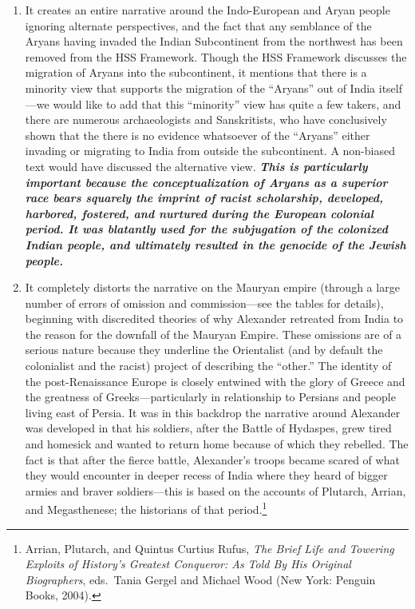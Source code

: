 \begin{enumerate} 
\item It creates an entire narrative around the Indo-European and Aryan people ignoring alternate perspectives, and the fact that any semblance of the Aryans having invaded the Indian Subcontinent from the northwest has been removed from the HSS Framework. Though the HSS Framework discusses the migration of Aryans into the subcontinent, it mentions that there is a minority view that supports the migration of the “Aryans” out of India itself—we would like to add that this “minority” view has quite a few takers, and there are numerous archaeologists and Sanskritists, who have conclusively shown that the there is no evidence whatsoever of the “Aryans” either invading or migrating to India from outside the subcontinent. A non-biased text would have discussed the alternative view. \textit{\textbf{This is particularly important because the conceptualization of Aryans as a superior race bears squarely the imprint of racist scholarship, developed, harbored, fostered, and nurtured during the European colonial period. It was blatantly used for the subjugation of the colonized Indian people, and ultimately resulted in the genocide of the Jewish people.}} 

\item It completely distorts the narrative on the Mauryan empire (through a large number of errors of omission and commission—see the tables for details), beginning with discredited theories of why Alexander retreated from India to the reason for the downfall of the Mauryan Empire. These omissions are of a serious nature because they underline the Orientalist (and by default the colonialist and the racist) project of describing the “other.” The identity of the post-Renaissance Europe is closely entwined with the glory of Greece and the greatness of Greeks—particularly in relationship to Persians and people living east of Persia. It was in this backdrop the narrative around Alexander was developed in that his soldiers, after the Battle of Hydaspes, grew tired and homesick and wanted to return home because of which they rebelled. The fact is that after the fierce battle, Alexander’s troops became scared of what they would encounter in deeper recess of India where they heard of bigger armies and braver soldiers—this is based on the accounts of Plutarch, Arrian, and Megasthenese; the historians of that period.\footnote{Arrian, Plutarch, and Quintus Curtius Rufus, \textit{The Brief Life and Towering Exploits of History's Greatest Conqueror: As Told By His Original Biographers}, eds.\ Tania Gergel and Michael Wood (New York: Penguin Books, 2004).} 


\end{enumerate}
